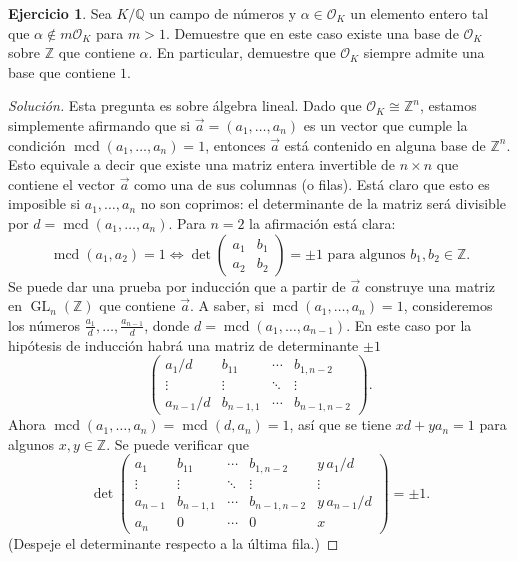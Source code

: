\documentclass{article}
\newcounter{tarea}
\theoremstyle{definition}
\newtheorem{ejercicio}{Ejercicio}[tarea]
\newenvironment{solucion}{\begin{proof}[Solución]}{\end{proof}}
\newcommand{\ZZ}{\mathbb{Z}}
\newcommand{\QQ}{\mathbb{Q}}
\renewcommand{\O}{\mathcal{O}}
\DeclareMathOperator{\GL}{GL}
\renewcommand\gcd{\operatorname{mcd}}
\begin{document}
\begin{ejercicio}
  Sea $K/\QQ$ un campo de números y $\alpha \in \O_K$ un elemento entero tal que
  $\alpha \notin m \O_K$ para $m > 1$. Demuestre que en este caso
  existe una base de $\O_K$ sobre $\ZZ$ que contiene $\alpha$. En particular,
  demuestre que $\O_K$ siempre admite una base que contiene $1$.

  \ifdefined\solutions
  \begin{solucion}
    Esta pregunta es sobre álgebra lineal. Dado que $\O_K \cong \ZZ^n$, estamos
    simplemente afirmando que si $\vec{a} = (a_1,\ldots,a_n)$ es un vector
    que cumple la condición $\gcd (a_1,\ldots,a_n) = 1$, entonces $\vec{a}$ está
    contenido en alguna base de $\ZZ^n$. Esto equivale a decir que existe una
    matriz entera invertible de $n\times n$ que contiene el vector $\vec{a}$
    como una de sus columnas (o filas). Está claro que esto es imposible si
    $a_1,\ldots,a_n$ no son coprimos: el determinante de la matriz será
    divisible por $d = \gcd (a_1,\ldots,a_n)$. Para $n = 2$ la afirmación está
    clara:
    \[ \gcd (a_1, a_2) = 1 \iff
       \det\begin{pmatrix} a_1 & b_1 \\ a_2 & b_2 \end{pmatrix} = \pm 1
       \text{ para algunos }b_1,b_2 \in \ZZ. \]
    Se puede dar una prueba por inducción que a partir de $\vec{a}$   
    construye una matriz en $\GL_n (\ZZ)$ que contiene $\vec{a}$. A saber, si
    $\gcd (a_1,\ldots,a_n) = 1$, consideremos los números
    $\frac{a_1}{d},\ldots,\frac{a_{n-1}}{d}$, donde
    $d = \gcd (a_1,\ldots,a_{n-1})$. En este caso por la hipótesis de inducción
    habrá una matriz de determinante $\pm 1$
    \[ \begin{pmatrix}
      a_1/d & b_{11} & \cdots & b_{1,n-2} \\
      \vdots & \vdots & \ddots & \vdots \\
      a_{n-1}/d & b_{n-1,1} & \cdots & b_{n-1,n-2}
    \end{pmatrix}. \]
    Ahora $\gcd (a_1,\ldots,a_n) = \gcd (d, a_n) = 1$, así que se tiene
    $x d + y a_n = 1$ para algunos $x,y\in \ZZ$. Se puede verificar que
    \[ \det \begin{pmatrix}
      a_1 & b_{11} & \cdots & b_{1,n-2} & y\,a_1/d \\
      \vdots & \vdots & \ddots & \vdots & \vdots \\
      a_{n-1} & b_{n-1,1} & \cdots & b_{n-1,n-2} & y\,a_{n-1}/d \\
      a_n & 0 & \cdots & 0 & x
    \end{pmatrix} = \pm 1. \]
    (Despeje el determinante respecto a la última fila.)


\end{solucion}
\end{ejercicio}
\end{document}
